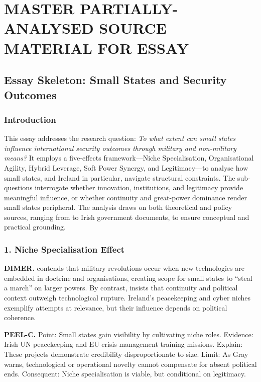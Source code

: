\chapter{MASTER PARTIALLY-ANALYSED SOURCE MATERIAL FOR ESSAY}

\section*{Essay Skeleton: Small States and Security Outcomes}

\subsection*{Introduction}
This essay addresses the research question: \textit{To what extent can small states influence international security outcomes through military and non-military means?} It employs a five-effects framework---Niche Specialisation, Organisational Agility, Hybrid Leverage, Soft Power Synergy, and Legitimacy---to analyse how small states, and Ireland in particular, navigate structural constraints. The sub-questions interrogate whether innovation, institutions, and legitimacy provide meaningful influence, or whether continuity and great-power dominance render small states peripheral. The analysis draws on both theoretical and policy sources, ranging from \textcite{KREPINEVICH_1994} to Irish government documents, to ensure conceptual and practical grounding.

\subsection*{1. Niche Specialisation Effect}
\textbf{DIMER.} \textcite{KREPINEVICH_1994} contends that military revolutions occur when new technologies are embedded in doctrine and organisations, creating scope for small states to ``steal a march'' on larger powers. By contrast, \textcite{GRAY_2005} insists that continuity and political context outweigh technological rupture. Ireland’s peacekeeping and cyber niches exemplify attempts at relevance, but their influence depends on political coherence.

\textbf{PEEL-C.} Point: Small states gain visibility by cultivating niche roles. Evidence: Irish UN peacekeeping and EU crisis-management training missions. Explain: These projects demonstrate credibility disproportionate to size. Limit: As Gray warns, technological or operational novelty cannot compensate for absent political ends. Consequent: Niche specialisation is viable, but conditional on legitimacy. 

